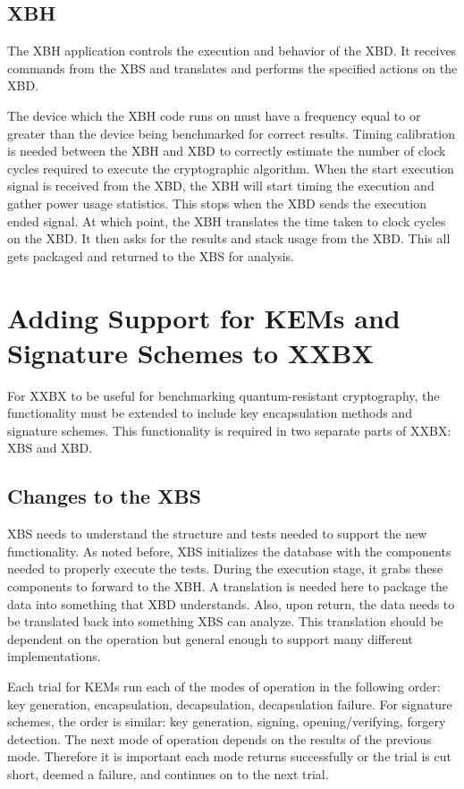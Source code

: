 \documentclass[10pt]{article}
\begin{document}
\subsection{XBH}
The XBH application controls the execution and behavior of the XBD. It receives commands 
from the XBS and translates and performs the specified actions on the XBD.

The device which the XBH code runs on must have a frequency equal to or greater than the 
device being benchmarked for correct results. Timing calibration is needed between the XBH 
and XBD to correctly estimate the number of clock cycles required to execute the cryptographic 
algorithm. When the start execution signal is received from the XBD, the XBH will start timing 
the execution and gather power usage statistics. This stops when the XBD sends the 
execution ended signal. At which point, the XBH translates the time taken to clock cycles 
on the XBD. It then asks for the results and stack usage from the XBD.
This all gets packaged and returned to the XBS for analysis.

\section{Adding Support for KEMs and Signature Schemes to XXBX}

For XXBX to be useful for benchmarking quantum-resistant cryptography, the functionality 
must be extended to include key encapsulation methods and signature schemes. This 
functionality is required in two separate parts of XXBX: XBS and XBD.

\subsection{Changes to the XBS}
XBS needs to understand the structure and tests needed to support the new functionality. 
As noted before, XBS initializes the database with the components needed to properly 
execute the tests. During the execution stage, it grabs these components to forward 
to the XBH. A translation is needed here to package the data into something that XBD  
understands. Also, upon return, the data needs to be translated back into something XBS 
can analyze. This translation should be dependent on the operation but general enough to 
support many different implementations.

Each trial for KEMs run each of the modes of operation in the following order: key generation, 
encapsulation, decapsulation, decapsulation failure. For signature schemes, the order is 
similar: key generation, signing, opening/verifying, forgery detection. The next mode of 
operation depends on the results of the previous mode. Therefore it is important each mode 
returns successfully or the trial is cut short, deemed a failure, and continues on to the 
next trial.
\end{document}
